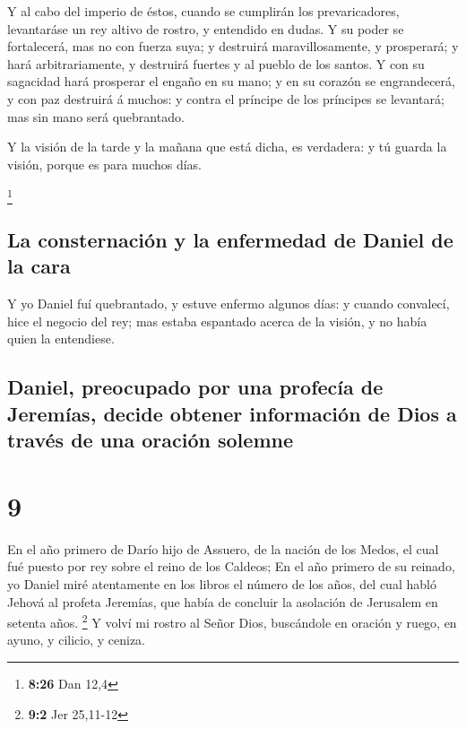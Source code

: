  Y al cabo del imperio de éstos, cuando se cumplirán los
prevaricadores, levantaráse un rey altivo de rostro, y entendido en
dudas.  Y su poder se fortalecerá, mas no con fuerza suya;
y destruirá maravillosamente, y prosperará; y hará arbitrariamente, y
destruirá fuertes y al pueblo de los santos.  Y con su
sagacidad hará prosperar el engaño en su mano; y en su corazón se
engrandecerá, y con paz destruirá á muchos: y contra el príncipe de los
príncipes se levantará; mas sin mano será quebrantado.

 Y la visión de la tarde y la mañana que está dicha, es
verdadera: y tú guarda la visión, porque es para muchos días.

\footnote{\textbf{8:26} Dan 12,4}

\hypertarget{la-consternaciuxf3n-y-la-enfermedad-de-daniel-de-la-cara}{%
\subsection{La consternación y la enfermedad de Daniel de la
cara}\label{la-consternaciuxf3n-y-la-enfermedad-de-daniel-de-la-cara}}

 Y yo Daniel fuí quebrantado, y estuve enfermo algunos
días: y cuando convalecí, hice el negocio del rey; mas estaba espantado
acerca de la visión, y no había quien la entendiese.

\hypertarget{daniel-preocupado-por-una-profecuxeda-de-jeremuxedas-decide-obtener-informaciuxf3n-de-dios-a-travuxe9s-de-una-oraciuxf3n-solemne}{%
\subsection{Daniel, preocupado por una profecía de Jeremías, decide
obtener información de Dios a través de una oración
solemne}\label{daniel-preocupado-por-una-profecuxeda-de-jeremuxedas-decide-obtener-informaciuxf3n-de-dios-a-travuxe9s-de-una-oraciuxf3n-solemne}}

\hypertarget{section-8}{%
\section{9}\label{section-8}}

 En el año primero de Darío hijo de Assuero, de la nación de
los Medos, el cual fué puesto por rey sobre el reino de los Caldeos;
 En el año primero de su reinado, yo Daniel miré atentamente
en los libros el número de los años, del cual habló Jehová al profeta
Jeremías, que había de concluir la asolación de Jerusalem en setenta
años. \footnote{\textbf{9:2} Jer 25,11-12}  Y volví mi
rostro al Señor Dios, buscándole en oración y ruego, en ayuno, y
cilicio, y ceniza.


